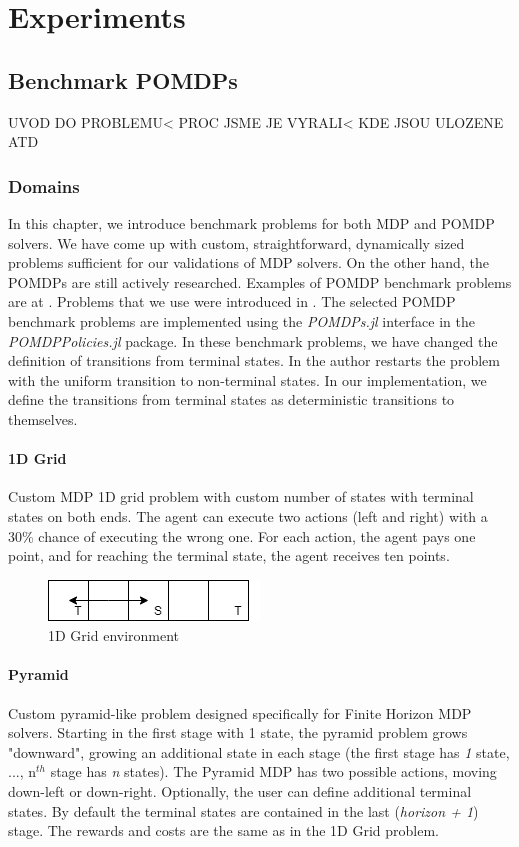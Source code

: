  \part{Experiments}

\chapter{Benchmark POMDPs}

UVOD DO PROBLEMU< PROC JSME JE VYRALI< KDE JSOU ULOZENE ATD

\section{Domains}

In this chapter, we introduce benchmark problems for both MDP and POMDP solvers. We have come up with custom, straightforward, dynamically sized problems sufficient for our validations of MDP solvers. On the other hand, the POMDPs are still actively researched. Examples of POMDP benchmark problems are at \cite{cassandra_1999}. Problems that we use were introduced in \cite{Littman}. The selected POMDP benchmark problems are implemented using the \textit{POMDPs.jl} interface in the \textit{POMDPPolicies.jl} package. In these benchmark problems, we have changed the definition of transitions from terminal states. In \cite{Littman} the author restarts the problem with the uniform transition to non-terminal states. In our implementation, we define the transitions from terminal states as deterministic transitions to themselves. 


\subsection{1D Grid}
Custom MDP 1D grid problem with custom number of states with terminal states on both ends. The agent can execute two actions (left and right) with a 30\% chance of executing the wrong one. For each action, the agent pays one point, and for reaching the terminal state, the agent receives ten points. 

\begin{figure}[ht]
\caption{1D Grid environment}
\centering
\includegraphics[scale=0.5]{pictures/1D_grid.png}
\end{figure}

\subsection{Pyramid}
Custom pyramid-like problem designed specifically for Finite Horizon MDP solvers. Starting in the first stage with 1 state, the pyramid problem grows "downward", growing an additional state in each stage (the first stage has \textit{1} state, ..., n$^{th}$ stage has \textit{n} states). The Pyramid MDP has two possible actions, moving down-left or down-right. Optionally, the user can define additional terminal states. By default the terminal states are contained in the last (\textit{horizon + 1}) stage. The rewards and costs are the same as in the 1D Grid problem.

